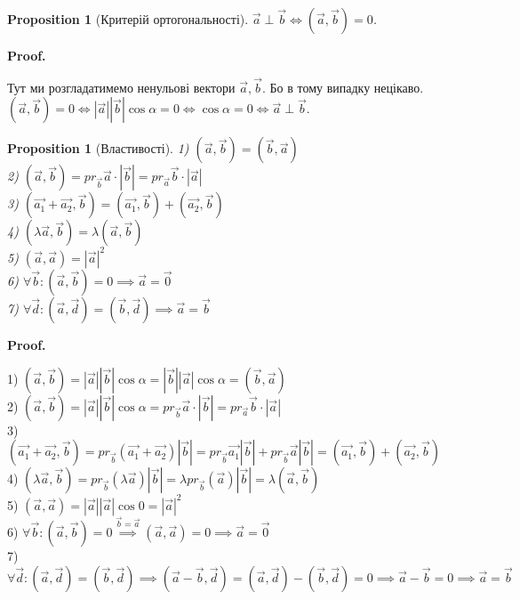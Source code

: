 \documentclass[a4paper, 10pt]{extarticle}
\makeatletter
\def\qed{$\blacksquare$}
\def\qed{$\blacksquare$}
\theoremstyle{theoremdd}
\theoremstyle{theoremdd}
\theoremstyle{theoremdd}
\theoremstyle{theoremdd}
\theoremstyle{theoremdd}
\newtheorem{proposition}[theorem]{Proposition}
\theoremstyle{theoremdd}
\theoremstyle{theoremdd}
\theoremstyle{theoremdd}
\renewenvironment{proof}[1][Proof.\\]{\par
\pushQED{\hfill \qed}%
\normalfont \topsep6\p@\@plus6\p@\relax
\trivlist
\item\relax
{\bfseries
#1\@addpunct{.}}\hspace\labelsep\ignorespaces
}{%
\popQED\endtrivlist\@endpefalse
}
\makeatother
\begin{document}
\begin{proposition}[Критерій ортогональності]
	$\vec{a} \perp \vec{b} \iff (\vec{a}, \vec{b}) = 0$.
\end{proposition}

\begin{proof}
Тут ми розгладатимемо ненульові вектори $\vec{a},\vec{b}$. Бо в тому випадку нецікаво.\\
	$(\vec{a}, \vec{b}) = 0 \iff |\vec{a}| |\vec{b}| \cos \alpha = 0 \iff \cos \alpha = 0 \iff \vec{a} \perp \vec{b}$.
\end{proof}

\begin{proposition}[Властивості]
	1) $(\vec{a}, \vec{b}) = (\vec{b}, \vec{a})$\\
	2) $(\vec{a}, \vec{b}) = pr_{\vec{b}} \vec{a} \cdot |\vec{b}| = pr_{\vec{a}} \vec{b} \cdot |\vec{a}|$\\
	3) $(\vec{a_1}+\vec{a_2}, \vec{b}) = (\vec{a_1}, \vec{b}) + (\vec{a_2}, \vec{b})$\\
	4) $(\lambda \vec{a}, \vec{b}) = \lambda (\vec{a}, \vec{b})$\\
	5) $(\vec{a}, \vec{a}) = |\vec{a}|^2$\\
	6) $\forall \vec{b}: (\vec{a}, \vec{b}) = 0 \implies \vec{a} = \vec{0}$\\
	7) $\forall \vec{d}: (\vec{a}, \vec{d}) = (\vec{b}, \vec{d}) \implies \vec{a} = \vec{b}$
\end{proposition}

\begin{proof}
	1) $(\vec{a}, \vec{b}) = |\vec{a}| |\vec{b}| \cos \alpha = |\vec{b}| |\vec{a}| \cos \alpha = (\vec{b}, \vec{a})$ \bigskip \\
	2) $(\vec{a}, \vec{b}) = |\vec{a}| |\vec{b}| \cos \alpha = pr_{\vec{b}} \vec{a} \cdot |\vec{b}| = pr_{\vec{a}} \vec{b} \cdot |\vec{a}|$ \bigskip \\
	3) $(\vec{a_1}+\vec{a_2}, \vec{b}) = pr_{\vec{b}} (\vec{a_1} + \vec{a_2}) |\vec{b}| = pr_{\vec{b}} \vec{a_1} |\vec{b}| + pr_{\vec{b}} \vec{a} |\vec{b}| = (\vec{a_1}, \vec{b}) + (\vec{a_2}, \vec{b})$ \bigskip \\
	4) $(\lambda \vec{a}, \vec{b}) = pr_{\vec{b}} (\lambda \vec{a}) |\vec{b}| = \lambda pr_{\vec{b}} (\vec{a}) |\vec{b}| = \lambda (\vec{a}, \vec{b})$ \bigskip \\
	5) $(\vec{a}, \vec{a}) = |\vec{a}| |\vec{a}| \cos 0 = |\vec{a}|^2$\bigskip \\
	6) $\forall \vec{b}: (\vec{a}, \vec{b}) = 0 \overset{\vec{b} = \vec{a}}{\implies} (\vec{a}, \vec{a}) = 0 \implies \vec{a} = \vec{0}$ \bigskip \\
	7) $\forall \vec{d}: (\vec{a}, \vec{d}) = (\vec{b}, \vec{d}) \implies (\vec{a}-\vec{b}, \vec{d}) = (\vec{a}, \vec{d}) - (\vec{b}, \vec{d}) = 0 \implies \vec{a} - \vec{b} = 0 \implies \vec{a} = \vec{b}$
\end{proof}
\end{document}

